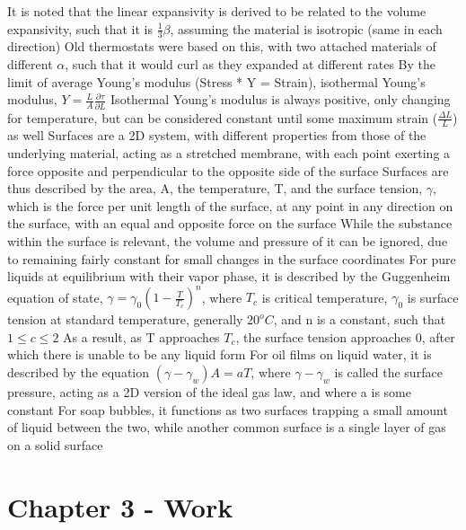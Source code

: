 \documentclass[11 pt, twoside]{article}
\newenvironment{outline*}
{
	\begin{outline}[enumerate]
	}
	{\end{outline}
}
\begin{document}
\begin{outline*}
\4 It is noted that the linear expansivity is derived to be related to the volume expansivity, such that it is $\frac{1}{3}\beta$, assuming the material is isotropic (same in each direction)
\4 Old thermostats were based on this, with two attached materials of different $\alpha$, such that it would curl as they expanded at different rates
\3 By the limit of average Young's modulus (Stress * Y = Strain), isothermal Young's modulus, $Y = \frac{L}{A}\frac{\partial \tau}{\partial L}$
\4 Isothermal Young's modulus is always positive, only changing for temperature, but can be considered constant until some maximum strain ($\frac{\Delta L}{L}$) as well
\1 Surfaces are a 2D system, with different properties from those of the underlying material, acting as a stretched membrane, with each point exerting a force opposite and perpendicular to the opposite side of the surface
\2 Surfaces are thus described by the area, A, the temperature, T, and the surface tension, $\gamma$, which is the force per unit length of the surface, at any point in any direction on the surface, with an equal and opposite force on the surface
\2 While the substance within the surface is relevant, the volume and pressure of it can be ignored, due to remaining fairly constant for small changes in the surface coordinates
\2 For pure liquids at equilibrium with their vapor phase, it is described by the Guggenheim equation of state, $\gamma = \gamma_0(1 - \frac{T}{T_c})^n$, where $T_c$ is critical temperature, $\gamma_0$ is surface tension at standard temperature, generally $20^o C$, and n is a constant, such that $1 \leq c \leq 2$
\3 As a result, as T approaches $T_c$, the surface tension approaches 0, after which there is unable to be any liquid form
\2 For oil films on liquid water, it is described by the equation $(\gamma - \gamma_w)A = aT$, where $\gamma - \gamma_w$ is called the surface pressure, acting as a 2D version of the ideal gas law, and where a is some constant
\2 For soap bubbles, it functions as two surfaces trapping a small amount of liquid between the two, while another common surface is a single layer of gas on a solid surface
\end{outline*}
\section{Chapter 3 - Work}
\end{document}
